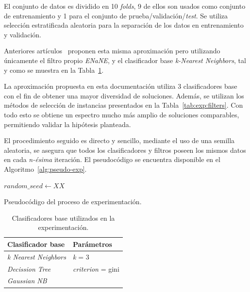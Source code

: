 El conjunto de datos es dividido en 10 \textit{folds}, 9 de ellos son usados como conjunto de entrenamiento y 1 para el conjunto de prueba/validación/\textit{test}. Se utiliza selección estratificada aleatoria para la separación de los datos en entrenamiento y validación.

Anteriores artículos~\cite{li2019selfk} proponen esta misma aproximación pero utilizando únicamente el filtro propio \emph{ENaNE}, y el clasificador base \textit{k-Nearest Neighbors}, tal y como se muestra en la Tabla~\ref{tab:exp:classifiers}.

La aproximación propuesta en esta documentación utiliza 3 clasificadores base con el fin de obtener una mayor diversidad de soluciones. Además, se utilizan los métodos de selección de instancias presentados en la Tabla~\ref{tab:exp:filters}.
Con todo esto se obtiene un espectro mucho más amplio de soluciones comparables, permitiendo validar la hipótesis planteada.

El  procedimiento seguido es directo y sencillo, mediante el uso de una semilla aleatoria, se asegura que todos los clasificadores y filtros poseen los mismos datos en cada \textit{n-ésima} iteración. El pseudocódigo se encuentra disponible en el Algoritmo~\ref{alg:pseudo-exp}.

\begin{algorithm}[]
  $random\_seed \leftarrow XX$\\
	\caption{Pseudocódigo del proceso de experimentación.}\label{alg:pseudo-exp}
\end{algorithm}

\begin{table}[]
    \centering
    \begin{tabular}{ll}
	\toprule
        \textbf{Clasificador base} & \textbf{Parámetros} \\ 
    \toprule
        \textit{k Nearest Neighbors} & \textit{k} = 3 \\
        \textit{Decission Tree} & \textit{criterion} = gini \\ 
        \textit{Gaussian NB} & ~ \\ 
    \bottomrule
    \end{tabular}
    \caption{Clasificadores base utilizados en la experimentación.}\label{tab:exp:classifiers}
\end{table}

